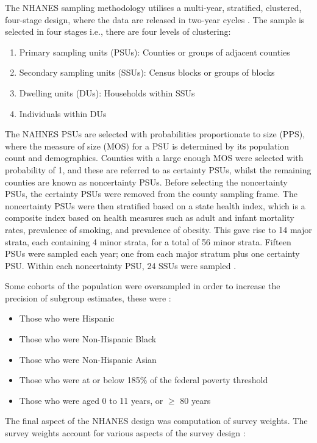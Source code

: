 The NHANES sampling methodology utilises a multi-year, stratified, clustered, four-stage design, where the data are released in two-year cycles \citep{nhanesdesign}. The sample is selected in four stages i.e., there are four levels of clustering:

\begin{enumerate}
	\item Primary sampling units (PSUs): Counties or groups of adjacent counties
	\item Secondary sampling units (SSUs): Census blocks or groups of blocks
	\item Dwelling units (DUs): Households within SSUs
	\item Individuals within DUs
\end{enumerate}

The NAHNES PSUs are selected with probabilities proportionate to size (PPS), where the measure of size (MOS) for a PSU is determined by its population count and demographics. Counties with a large enough MOS were selected with probability of 1, and these are referred to as certainty PSUs, whilst the remaining counties are known as noncertainty PSUs. Before selecting the noncertainty PSUs, the certainty PSUs were removed from the county sampling frame. The noncertainty PSUs were then stratified based on a state health index, which is a composite index based on health measures such as adult and infant mortality rates, prevalence of smoking, and prevalence of obesity. This gave rise to 14 major strata, each containing 4 minor strata, for a total of 56 minor strata. Fifteen PSUs were sampled each year; one from each major stratum plus one certainty PSU. Within each noncertainty PSU, 24 SSUs were sampled \citep{nhanesdesign}.

Some cohorts of the population were oversampled in order to increase the precision of subgroup estimates, these were \citep{nhanesdesign}: 

\begin{itemize}
	\item Those who were Hispanic
	\item Those who were Non-Hispanic Black
	\item Those who were Non-Hispanic Asian
	\item Those who were at or below 185\% of the federal poverty threshold
	\item Those who were aged 0 to 11 years, or $\geq$ 80 years
\end{itemize}

The final aspect of the NHANES design was computation of survey weights. The survey weights account for various aspects of the survey design \citep{nhanesdesign}:

